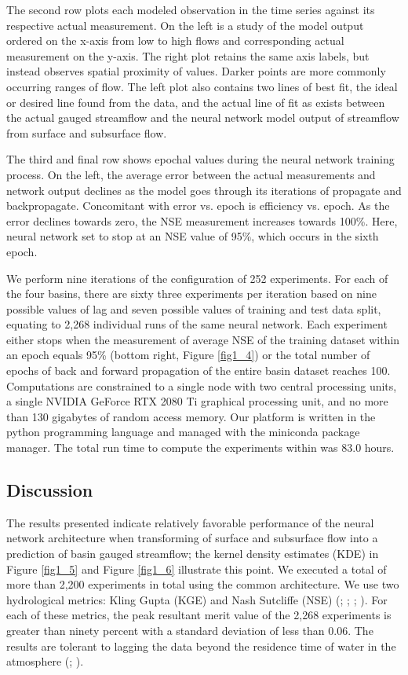 \begin{refsection}
The second row plots each modeled observation in the time series against its respective actual measurement. On the left is a study of the model output ordered on the x-axis from low to high flows and corresponding actual measurement on the y-axis. The right plot retains the same axis labels, but instead observes spatial proximity of values. Darker points are more commonly occurring ranges of flow. The left plot also contains two lines of best fit, the ideal or desired line found from the data, and the actual line of fit as exists between the actual gauged streamflow and the neural network model output of streamflow from surface and subsurface flow.

The third and final row shows epochal values during the neural network training process. On the left, the average error between the actual measurements and network output declines as the model goes through its iterations of propagate and backpropagate. Concomitant with error vs. epoch is efficiency vs. epoch. As the error declines towards zero, the NSE measurement increases towards 100\%. Here, neural network set to stop at an NSE value of 95\%, which occurs in the sixth epoch.

We perform nine iterations of the configuration of 252 experiments. For each of the four basins, there are sixty three experiments per iteration based on nine possible values of lag and seven possible values of training and test data split, equating to 2,268 individual runs of the same neural network. Each experiment either stops when the measurement of average NSE of the training dataset within an epoch equals 95\% (bottom right, Figure \ref{fig1_4}) or the total number of epochs of back and forward propagation of the entire basin dataset reaches 100. Computations are constrained to a single node with two central processing units, a single NVIDIA GeForce RTX 2080 Ti graphical processing unit, and no more than 130 gigabytes of random access memory. Our platform is written in the python programming language and managed with the miniconda package manager. The total run time to compute the experiments within was 83.0 hours.

\subsection{Discussion}

The results presented indicate relatively favorable performance of the neural network architecture when transforming of surface and subsurface flow into a prediction of basin gauged streamflow; the kernel density estimates (KDE) in Figure \ref{fig1_5} and Figure \ref{fig1_6} illustrate this point. We executed a total of more than 2,200 experiments in total using the common architecture. We use two hydrological metrics: Kling Gupta (KGE) and Nash Sutcliffe (NSE) (\cite{nash1970river}; \cite{gupta2009decomposition}; \cite{gupta2011typical}; \cite{knoben2019inherent}). For each of these metrics, the peak resultant merit value of the 2,268 experiments is greater than ninety percent with a standard deviation of less than 0.06. The results are tolerant to lagging the data beyond the residence time of water in the atmosphere (\cite{van2017residence}; \cite{gimeno2021residence}).


\end{refsection}
